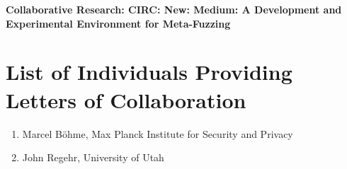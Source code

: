\documentclass[12pt]{article}
\begin{document}
\begin{center} {\Large\sf\textbf{Collaborative Research: CIRC: New: Medium: A
      Development and Experimental Environment for Meta-Fuzzing}}
\end{center}

\section*{List of Individuals Providing Letters of Collaboration}

\begin{enumerate}
\item Marcel B\"ohme, Max Planck Institute for Security and Privacy
  \item John Regehr, University of Utah
  \end{enumerate}
\end{document}
